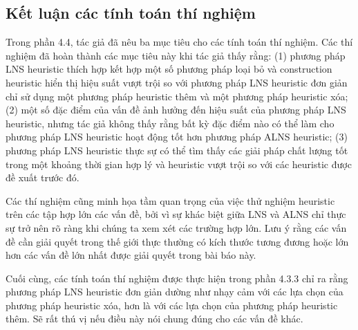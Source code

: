 \subsection{Kết luận các tính toán thí nghiệm}
Trong phần 4.4, tác giả đã nêu ba mục tiêu cho các tính toán thí nghiệm. Các thí nghiệm đã hoàn thành các mục tiêu này khi tác giả thấy rằng: (1) phương pháp LNS heuristic thích hợp kết hợp một số phương pháp loại bỏ và construction heuristic hiển thị hiệu suất vượt trội so với phương pháp LNS heuristic đơn giản chỉ sử dụng một phương pháp heuristic thêm và một phương pháp heuristic xóa; (2) một số đặc điểm của vấn đề ảnh hưởng đến hiệu suất của phương pháp LNS heuristic, nhưng tác giả không thấy rằng bất kỳ đặc điểm nào có thể làm cho phương pháp LNS heuristic hoạt động tốt hơn phương pháp ALNS heuristic; (3) phương pháp LNS heuristic thực sự có thể tìm thấy các giải pháp chất lượng tốt trong một khoảng thời gian hợp lý và heuristic vượt trội so với các heuristic được đề xuất trước đó.

Các thí nghiệm cũng minh họa tầm quan trọng của việc thử nghiệm heuristic trên các tập hợp lớn các vấn đề, bởi vì sự khác biệt giữa LNS và ALNS chỉ thực sự trở nên rõ ràng khi chúng ta xem xét các trường hợp lớn. Lưu ý rằng các vấn đề cần giải quyết trong thế giới thực thường có kích thước tương đương hoặc lớn hơn các vấn đề lớn nhất được giải quyết trong bài báo này.

Cuối cùng, các tính toán thí nghiệm được thực hiện trong phần 4.3.3 chỉ ra rằng phương pháp LNS heuristic đơn giản dường như nhạy cảm với các lựa chọn của phương pháp heuristic xóa, hơn là với các lựa chọn của phương pháp heuristic thêm. Sẽ rất thú vị nếu điều này nói chung đúng cho các vấn đề khác.
